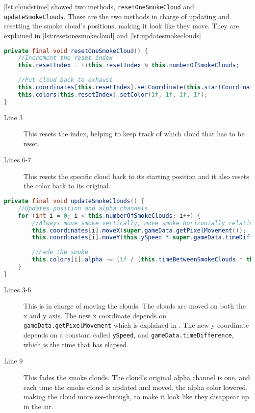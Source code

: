 \autoref{lst:cloudstime} showed two methods, \lstinline|resetOneSmokeCloud| and \lstinline|updateSmokeClouds|. These are the two methods in charge of updating and resetting the smoke cloud's positions, making it look like they move. They are explained in \autoref{lst:resetonesmokecloud} and \autoref{lst:updatesmokeclouds}

\begin{lstlisting}[language=java,firstnumber=1,caption={Function handling the resetting of a smoke cloud.},label=lst:resetonesmokecloud]
private final void resetOneSmokeCloud() {
    //Increment the reset index
    this.resetIndex = ++this.resetIndex % this.numberOfSmokeClouds;
    
    //Put cloud back to exhaust
    this.coordinates[this.resetIndex].setCoordinate(this.startCoordinate.getX(), this.startCoordinate.getY());
    this.colors[this.resetIndex].setColor(1f, 1f, 1f, 1f);
}
\end{lstlisting}

\begin{description}
\item[Line 3] This resets the index, helping to keep track of which cloud that has to be reset. 
\item[Lines 6-7] This resets the specific cloud back to its starting position and it also resets the color back to its original. 
\end{description}
 
\begin{lstlisting}[language=java,firstnumber=1,caption={Function handling the updating of a smoke cloud.},label=lst:updatesmokeclouds]
private final void updateSmokeClouds() {
    //Updates position and alpha channels
    for (int i = 0; i < this.numberOfSmokeClouds; i++) {
        //Always move smoke vertically, move smoke horizontally relative to the train speed.
        this.coordinates[i].moveX(super.gameData.getPixelMovement());
        this.coordinates[i].moveY(this.ySpeed * super.gameData.timeDifference);
        
        //Fade the smoke
        this.colors[i].alpha -= (1f / (this.timeBetweenSmokeClouds * this.numberOfSmokeClouds)) * super.gameData.timeDifference;
    }
}
\end{lstlisting}

\begin{description}
\item[Lines 3-6] This is in charge of moving the clouds. The clouds are moved on both the x and y axis. The new x coordinate depends on \lstinline|gameData.getPixelMovement| which is explained in . The new y coordinate depends on a constant called \lstinline|ySpeed|, and \lstinline|gameData.timeDifference|, which is the time that has elapsed.
\item[Line 9] This fades the smoke clouds. The cloud's original alpha channel is one, and each time the smoke cloud is updated and moved, the alpha color lowered, making the cloud more see-through, to make it look like they disappear up in the air. 
\end{description}

